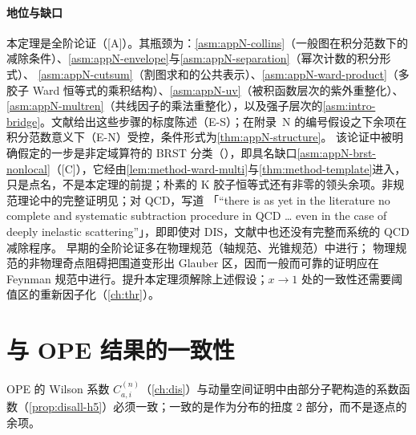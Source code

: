 \paragraph{地位与缺口}
本定理是全阶论证（[A]）。其瓶颈为：\cref{asm:appN-collins}（一般图在积分范数下的减除条件）、\cref{asm:appN-envelope}与\cref{asm:appN-separation}（幂次计数的积分形式）、
\cref{asm:appN-cutsum}（割图求和的公共表示）、\cref{asm:appN-ward-product}（多胶子 Ward 恒等式的乘积结构）、\cref{asm:appN-uv}（被积函数层次的紫外重整化）、
\cref{asm:appN-multren}（共线因子的乘法重整化），以及强子层次的\cref{asm:intro-bridge}。文献给出这些步骤的标度陈述（E-S）；在附录~N 的编号假设之下余项在积分范数意义下（E-N）受控，条件形式为\cref{thm:appN-structure}。
该论证中被明确假定的一步是非定域算符的 BRST 分类（\cite[第~11.3.2~节，第~407--410~页]{Collins2011}），即具名缺口\cref{asm:appN-brst-nonlocal}（[C]），它经由\cref{lem:method-ward-multi}与\cref{thm:method-template}进入，
只是点名，不是本定理的前提；朴素的 K 胶子恒等式还有非零的领头余项\cite{Collins:2008sg}。非规范理论中的完整证明见\cite[第~8.9~节]{Collins2011}；对 QCD，\cite[第~10.1~节]{CollinsSoperSterman1989}写道
「“there is as yet in the literature no complete and systematic subtraction procedure in QCD \ldots{} even in the case of deeply inelastic scattering”」，即即使对 DIS，文献中也还没有完整而系统的 QCD 减除程序。
早期的全阶论证\cite{EllisEtAl1979,Ellis:1978sf,AmatiPetronzioVeneziano1978a,AmatiPetronzioVeneziano1978b,Mueller1978,CurciFurmanskiPetronzio1980}多在物理规范（轴规范、光锥规范）中进行；
物理规范的非物理奇点阻碍把围道变形出 Glauber 区，因而一般而可靠的证明应在 Feynman 规范中进行\cite[第~12.6~节]{Collins2011}。提升本定理须解除上述假设；$x\to1$ 处的一致性还需要阈值区的重新因子化（\cref{ch:thr}）。

\section{与 OPE 结果的一致性}\label{sec:disall-consistency}

OPE 的 Wilson 系数 $C^{(n)}_{a,i}$（\cref{ch:dis}）与动量空间证明中由部分子靶构造的系数函数（\cref{prop:disall-h5}）必须一致；一致的是作为分布的扭度 2 部分，而不是逐点的余项。

